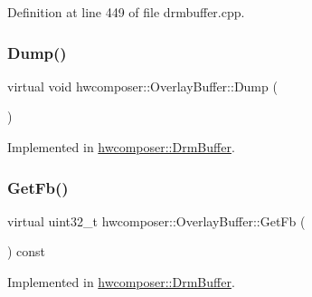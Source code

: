 Definition at line 449 of file drmbuffer.\+cpp.


\begin{DoxyCode}{0}
\end{DoxyCode}
\mbox{\label{classhwcomposer_1_1OverlayBuffer_a0f1c365c9c73e7608d07cf699279ddcb}} 
\subsubsection{\texorpdfstring{Dump()}{Dump()}}
{\footnotesize\ttfamily virtual void hwcomposer\+::\+Overlay\+Buffer\+::\+Dump (\begin{DoxyParamCaption}{ }\end{DoxyParamCaption})\hspace{0.3cm}{\ttfamily [pure virtual]}}



Implemented in \mbox{\hyperlink{classhwcomposer_1_1DrmBuffer_ac4087d8c1084fede3414f6e578de9183}{hwcomposer\+::\+Drm\+Buffer}}.

\mbox{\label{classhwcomposer_1_1OverlayBuffer_a9860269bb8712eee5c7c4ca1c8846e9a}} 
\subsubsection{\texorpdfstring{Get\+Fb()}{GetFb()}}
{\footnotesize\ttfamily virtual uint32\+\_\+t hwcomposer\+::\+Overlay\+Buffer\+::\+Get\+Fb (\begin{DoxyParamCaption}{ }\end{DoxyParamCaption}) const\hspace{0.3cm}{\ttfamily [pure virtual]}}



Implemented in \mbox{\hyperlink{classhwcomposer_1_1DrmBuffer_accd7dc14e04bd76beca146fc3d265f81}{hwcomposer\+::\+Drm\+Buffer}}.

